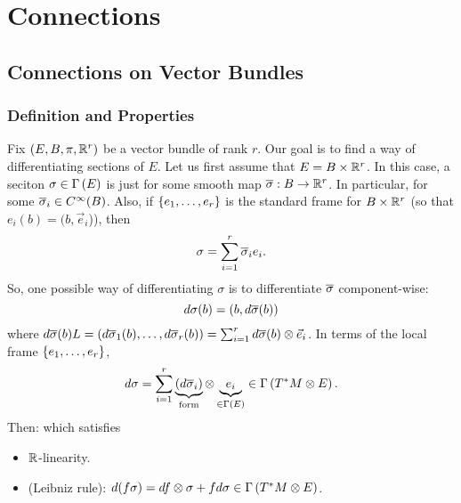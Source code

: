 \documentclass[main.tex]{subfiles}
\begin{document}
\section{Connections}

\subsection{Connections on Vector Bundles}

\subsubsection{Definition and Properties}

Fix $(E, B, \pi, \mathbb{R}^r)$ be a vector bundle of rank $r$. Our goal is to find a way of differentiating sections of $E$. Let us first assume that $E = B \times \mathbb{R}^r$. In this case, a seciton $\sigma \in \Gamma\left( E \right)$ is just
for some smooth map $\overline{\sigma}: B \to \mathbb{R}^r$. In particular,
 for some $\overline{\sigma}_i \in C^\infty(B)$. Also, if $\left\{e_1, \dots, e_r\right\}$ is the standard frame for $B \times \mathbb{R}^r$ (so that $e_i(b) = (b, \vec{e}_i$)), then
\[
\sigma = \sum_{i=1}^r \overline{\sigma}_i e_i.
\]
So, one possible way of differentiating $\sigma$ is to differentiate $\overline{\sigma}$ component-wise:
\[
d \sigma(b) = (b, d \overline{\sigma}(b))
\]
where $d \overline{\sigma}(b) L= \left(  d\overline{\sigma}_1(b), \dots, d \overline{\sigma}_r(b) \right) = \sum_{i=1}^r d \overline{\sigma}(b) \otimes \vec{e}_i$.
In terms of the local frame $\left\{e_1, \dots, e_r\right\}$,
\[
d\sigma = \sum_{i=1}^r \underbrace{(d \overline{\sigma}_i)}_{\text{form}} \otimes \underbrace{e_i}_{\in \Gamma\left( E \right)} \in \Gamma\left( T^*M \otimes E \right).
\]
Then:
which satisfies
\begin{itemize}
    \item $\mathbb{R}$-linearity.
    \item (Leibniz rule): $d(f\sigma) = df \otimes \sigma + f d\sigma \in \Gamma\left( T^*M \otimes E \right)$.
\end{itemize}
\end{document}

